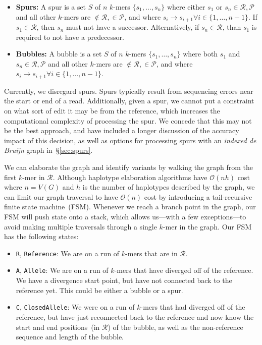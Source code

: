 \documentclass[11pt]{article}
\begin{document}
\begin{itemize}
\item \textbf{Spurs:} A spur is a set $S$ of $n$ $k$-mers $\{s_1, \dots, s_n\}$ where either $s_1$ or
$s_n \in \mathcal{R}, \mathcal{P}$ and all other $k$-mers are $\not\in \mathcal{R}, \in \mathcal{P}$,
and where $s_i \rightarrow s_{i + 1} \forall i \in \{1, \dots, n - 1\}$. If $s_1 \in \mathcal{R}$, then $s_n$ must 
not have a successor. Alternatively, if $s_n \in \mathcal{R}$, than $s_1$ is required to not have a
predecessor.
\item \textbf{Bubbles:} A bubble is a set $S$ of $n$ $k$-mers $\{s_1, \dots, s_n\}$ where both $s_1$ and
$s_n \in \mathcal{R}, \mathcal{P}$ and all other $k$-mers are $\not\in \mathcal{R}, \in \mathcal{P}$, and
where $s_i \rightarrow s_{i + 1} \forall i \in \{1, \dots, n - 1\}$.
\end{itemize}

Currently, we disregard spurs. Spurs typically result from sequencing errors near the start or end of a
read. Additionally, given a spur, we cannot put a constraint on what sort of edit it may be from the
reference, which increases the computational complexity of processing the spur. We concede that this
may not be the best approach, and have included a longer discussion of the accuracy impact of this
decision, as well as options for processing spurs with an \emph{indexed de Bruijn} graph in~\S\ref{sec:spurs}.

We can elaborate the graph and identify variants by walking the graph from the first $k$-mer in
$\mathcal{R}$. Although haplotype elaboration algorithms have $\mathcal{O}(nh)$ cost where
$n = V(G)$ and $h$ is the number of haplotypes described by the graph, we can limit our graph traversal
to have $\mathcal{O}(n)$ cost by introducing a tail-recursive finite state machine~(FSM). Whenever we
reach a branch point in the graph, our FSM will push state onto a stack, which allows us---with a few
exceptions---to avoid making multiple traversals through a single $k$-mer in the graph. Our FSM has
the following states:

\begin{itemize}
\item \texttt{R}, \texttt{Reference}: We are on a run of $k$-mers that are in $\mathcal{R}$.
\item \texttt{A}, \texttt{Allele}: We are on a run of $k$-mers that have diverged off of the reference. We
have a divergence start point, but have not connected back to the reference yet. This could be either
a bubble or a spur. 
\item \texttt{C}, \texttt{ClosedAllele}: We were on a run of $k$-mers that had diverged off of the reference,
but have just reconnected back to the reference and now know the start and end positions~(in
$\mathcal{R}$) of the bubble, as well as the non-reference sequence and length of the bubble.
\end{itemize}
\end{document}
